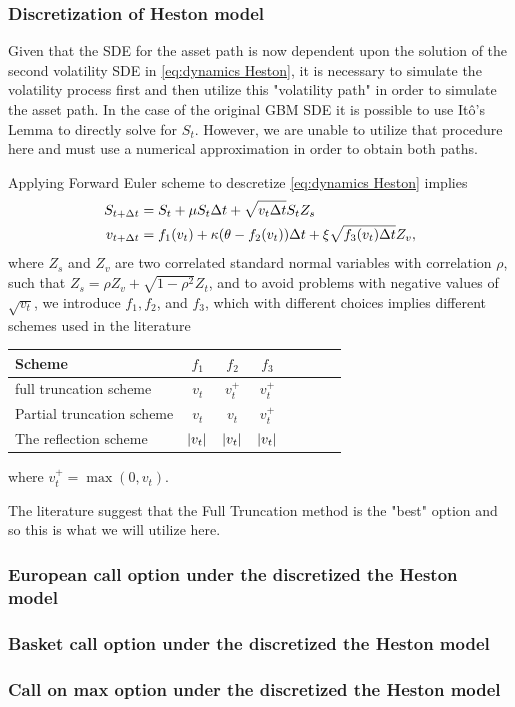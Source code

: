 \subsubsection{Discretization of Heston model}
Given that the SDE for the asset path is now dependent  upon the solution of the second volatility SDE in \eqref{eq:dynamics Heston}, it is necessary to simulate the volatility process first and then utilize this "volatility path" in order to simulate the asset path. In the case of the original GBM SDE it is possible to use It\^o's Lemma to directly solve for $S_t$. However, we are unable to utilize that procedure here and must use a numerical approximation in order to obtain both paths. 

Applying Forward Euler scheme to descretize \ref{eq:dynamics Heston} implies 
\begin{align}\label{eq:FE_Heston_discrete}
S_{t+\Delta t}&= S_t +\mu S_t \Delta t+\sqrt{v_t \Delta t}S_t Z_s \nonumber\\
v_{t+\Delta t}&=f_1(v_t)+\kappa (\theta-f_2(v_t)) \Delta t+\xi \sqrt{f_3(v_t) \Delta t} Z_v,
\end{align}
where $Z_s$ and $Z_v$  are two correlated standard normal variables with correlation $\rho$, such that $Z_s=\rho Z_v+\sqrt{1-\rho^2} Z_t$, and to avoid problems with negative values of $\sqrt{v_t}$, we introduce $f_1, f_2$, and $f_3$, which with different choices implies different schemes used in the literature 

\FloatBarrier
\begin{table}[h!]
	\centering
	\begin{tabular}{l*{6}{c}r}
		\toprule[1.5pt]
	Scheme &  $f_1$& $f_2$  & $f_3$     \\
	\hline
	full truncation scheme & $v_t$ &  $v_t^+$&$v_t^+$\\
	Partial truncation scheme & $v_t$ &  $v_t$&$v_t^+$\\
	The reflection scheme  &$\left\lvert v_t\right\rvert$ & $\left\lvert v_t\right\rvert$& $\left\lvert v_t\right\rvert$\\
			\bottomrule[1.25pt]
	\end{tabular}
	\label{Numerical schemes for CIR process}
\end{table}
\FloatBarrier
where  $v_t^+=\max(0,v_t)$.

The literature suggest that the Full Truncation method is the "best" option and so this is what we will utilize here. 

\subsubsection{European call option  under the discretized the Heston model }
\subsubsection{Basket call option under the discretized the Heston model }

\subsubsection{Call on max option under the discretized the Heston model }

